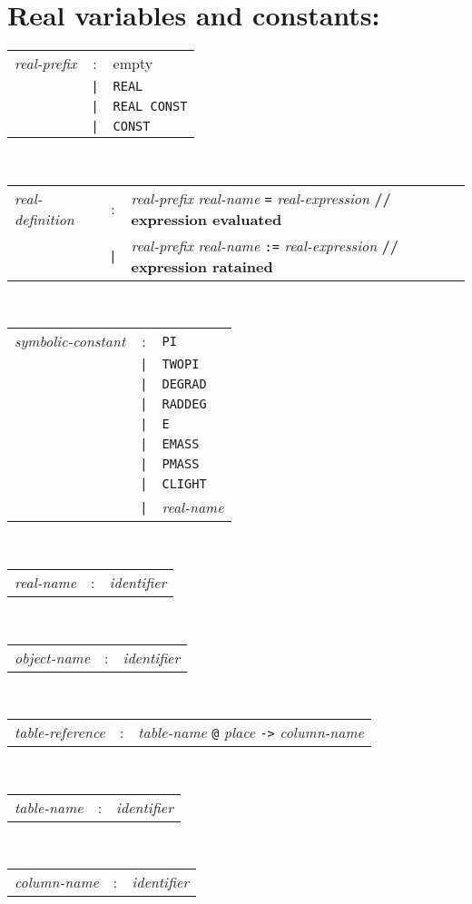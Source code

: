 \section*{Real variables and constants:}
\begin{tabular}{p{4cm}cl}
\textit{real-prefix}
  &:& empty \\
  &\texttt{|}& \texttt{REAL} \\
  &\texttt{|}& \texttt{REAL CONST} \\
  &\texttt{|}& \texttt{CONST}
\end{tabular}
\\
\begin{tabular}{p{4cm}cl}
\textit{real-definition}
  &:& \textit{real-prefix} \textit{real-name} \texttt{=}
    \textit{real-expression} \textbf{// expression evaluated} \\
  &\texttt{|}& \textit{real-prefix} \textit{real-name} \texttt{:=}
    \textit{real-expression} \textbf{// expression ratained}
\end{tabular}
\\
\begin{tabular}{p{4cm}cl}
\textit{symbolic-constant}
  &:& \texttt{PI} \\
  &\texttt{|}& \texttt{TWOPI} \\
  &\texttt{|}& \texttt{DEGRAD} \\
  &\texttt{|}& \texttt{RADDEG} \\
  &\texttt{|}& \texttt{E} \\
  &\texttt{|}& \texttt{EMASS} \\
  &\texttt{|}& \texttt{PMASS} \\
  &\texttt{|}& \texttt{CLIGHT} \\
  &\texttt{|}& \textit{real-name}
\end{tabular}
\\
\begin{tabular}{p{4cm}cl}
\textit{real-name}
  &:& \textit{identifier}
\end{tabular}
\\
\begin{tabular}{p{4cm}cl}
\textit{object-name}
  &:& \textit{identifier}
\end{tabular}
\\
\begin{tabular}{p{4cm}cl}
\textit{table-reference}
  &:& \textit{table-name} \texttt{@} \textit{place} \texttt{->}
    \textit{column-name}
\end{tabular}
\\
\begin{tabular}{p{4cm}cl}
\textit{table-name}
  &:& \textit{identifier}
\end{tabular}
\\
\begin{tabular}{p{4cm}cl}
\textit{column-name}
  &:& \textit{identifier}
\end{tabular}


